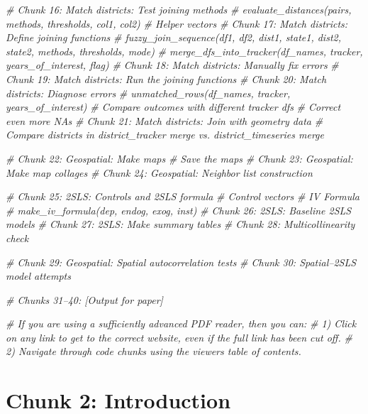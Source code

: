 \documentclass[
]{article}
\newenvironment{Shaded}{\begin{snugshade}}{\end{snugshade}}
\newcommand{\CommentTok}[1]{\textcolor[rgb]{0.56,0.35,0.01}{\textit{#1}}}
\begin{document}
\begin{Shaded}
\begin{Highlighting}[]
\CommentTok{\# Chunk 16: Match districts: Test joining methods}
  \CommentTok{\# evaluate\_distances(pairs, methods, thresholds, col1, col2)}
  \CommentTok{\# Helper vectors}
\CommentTok{\# Chunk 17: Match districts: Define joining functions}
  \CommentTok{\# fuzzy\_join\_sequence(df1, df2, dist1, state1, dist2, state2, methods, thresholds, mode)}
  \CommentTok{\# merge\_dfs\_into\_tracker(df\_names, tracker, years\_of\_interest, flag)}
\CommentTok{\# Chunk 18: Match districts: Manually fix errors}
\CommentTok{\# Chunk 19: Match districts: Run the joining functions}
\CommentTok{\# Chunk 20: Match districts: Diagnose errors}
  \CommentTok{\# unmatched\_rows(df\_names, tracker, years\_of\_interest)}
  \CommentTok{\# Compare outcomes with different tracker dfs}
  \CommentTok{\# Correct even more NAs}
\CommentTok{\# Chunk 21: Match districts: Join with geometry data}
  \CommentTok{\# Compare districts in district\_tracker merge vs. district\_timeseries merge}

\CommentTok{\# Chunk 22: Geospatial: Make maps}
  \CommentTok{\# Save the maps}
\CommentTok{\# Chunk 23: Geospatial: Make map collages}
\CommentTok{\# Chunk 24: Geospatial: Neighbor list construction}

\CommentTok{\# Chunk 25: 2SLS: Controls and 2SLS formula}
  \CommentTok{\# Control vectors}
  \CommentTok{\# IV Formula}
    \CommentTok{\# make\_iv\_formula(dep, endog, exog, inst)}
\CommentTok{\# Chunk 26: 2SLS: Baseline 2SLS models}
\CommentTok{\# Chunk 27: 2SLS: Make summary tables}
\CommentTok{\# Chunk 28: Multicollinearity check}

\CommentTok{\# Chunk 29: Geospatial: Spatial autocorrelation tests}
\CommentTok{\# Chunk 30: Spatial–2SLS model attempts}

\CommentTok{\# Chunks 31–40: [Output for paper]}




\CommentTok{\# If you are using a sufficiently advanced PDF reader, then you can:}
\CommentTok{\# 1) Click on any link to get to the correct website, even if the full link has been cut off.}
\CommentTok{\# 2) Navigate through code chunks using the viewer\textquotesingle{}s table of contents.}
\end{Highlighting}
\end{Shaded}

\section*{Chunk 2: Introduction}\label{chunk-2-introduction}
\end{document}
